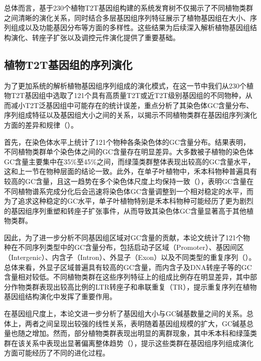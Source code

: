 总体而言，基于230个植物T2T基因组构建的系统发育树不仅揭示了不同植物类群之间清晰的演化关系，同时结合多层基因组序列特征展示了植物基因组在大小、序列组成以及功能基因分布等方面的多样性。这些结果为后续深入解析植物基因组结构演化、转座子扩张以及调控元件演化提供了重要基础。

\subsection{植物T2T基因组的序列演化}

为了更加系统的解析植物基因组序列组成的演化模式，在这一节中我们从230个植物T2T基因组中选取了121个具有高质量T2T或近T2T级别基因组的不同物种，从而减小T2T泛基因组中可能存在的统计误差，重点分析了其染色体GC含量分布、序列组成特征以及基因组大小之间的关系，以揭示不同植物类群在基因组序列演化方面的差异和规律（）。

首先，在染色体水平上统计了121个物种各条染色体的GC含量分布。结果表明，不同植物类群单个染色体之间的GC含量存在明显差异。大多数被子植物的染色体GC含量主要集中在35\%至45\%之间，而绿藻类群整体表现出较高的GC含量水平，这和上一节在物种层面的结论一致。此外，在单子叶植物中，禾本科物种普遍具有较高的GC含量，且这一趋势在多个染色体尺度上均保持一致（），表明GC含量在不同植物谱系完成分化后会迅速将染色体GC含量调整到一个相对稳定的水平，而为了追求这种稳定的GC水平，单子叶植物特别是禾本科物种可能经历了更为剧烈的基因组序列重塑和转座子扩张事件，从而导致其染色体GC含量显著高于其他植物类群。

因此，为了进一步分析不同基因组区域对GC含量的贡献，本论文统计了121个物种在不同序列类型中的GC含量分布，包括启动子区域（Promoter）、基因间区（Intergenic）、内含子（Intron）、外显子（Exon）以及不同类型的重复序列（）。总体来看，外显子区域普遍具有较高的GC含量，而内含子及DNA转座子等的GC含量相对较低。不同植物类群在这些序列特征上的组成比例存在明显差异，其中部分作物类群表现出较高比例的LTR转座子和串联重复（TR），提示重复序列在植物基因组结构演化中发挥了重要作用。

在基因组尺度上，本论文进一步分析了基因组大小与GC碱基数量之间的关系。总体上，两者之间呈现出较强的线性关系，表明随着基因组规模的扩大，GC碱基总量也随之增加。然而，部分植物类群表现出明显的离群现象，其中禾本科和绿藻类群在该关系中表现出显著偏离整体趋势（），提示这些类群在基因组序列组成演化方面可能经历了不同的进化过程。

